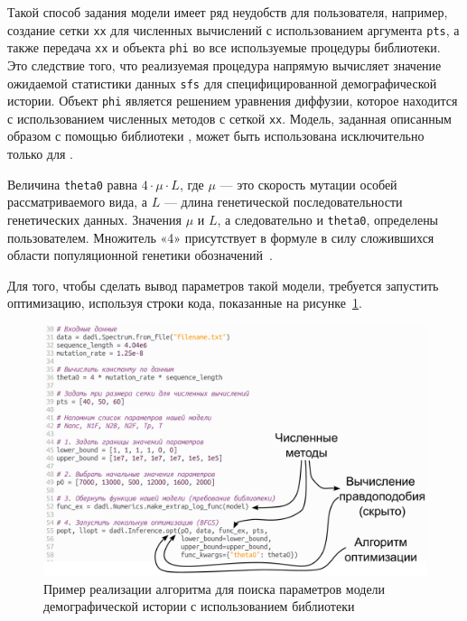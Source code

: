 \documentclass[a4paper,14pt,oneside,openany,article]{memoir}
\begin{document}
Такой способ задания модели имеет ряд неудобств для пользователя, например, создание сетки \texttt{xx} для численных вычислений с использованием аргумента \texttt{pts}, а также передача \texttt{xx} и объекта \texttt{phi} во все используемые процедуры библиотеки.
Это следствие того, что реализуемая процедура напрямую вычисляет значение ожидаемой статистики данных \texttt{sfs} для специфицированной демографической истории.
Объект \texttt{phi} является решением уравнения диффузии, которое находится с использованием численных методов с сеткой \texttt{xx}.
Модель, заданная описанным образом с помощью библиотеки \dadi, может быть использована исключительно только для \dadi.

Величина \texttt{theta0} равна $4\cdot \mu \cdot L$, где $\mu$ --- это скорость мутации особей рассматриваемого вида, а $L$ --- длина генетической последовательности генетических данных.
Значения $\mu$ и $L$, а следовательно и \texttt{theta0}, определены пользователем.
Множитель «4» присутствует в формуле в силу сложившихся области популяционной генетики обозначений~.

Для того, чтобы сделать вывод параметров такой модели, требуется запустить оптимизацию, используя строки кода, показанные на рисунке~\ref{fig:dadi:ls_run}.
\begin{figure}[h]
    \centering
    \includegraphics[width=0.8\linewidth]{images_2/dadi_local_search.pdf}
    \caption{Пример реализации алгоритма для поиска параметров модели демографической истории с использованием библиотеки \dadi}
    \label{fig:dadi:ls_run}
\end{figure}
\end{document}
